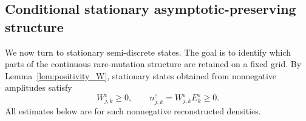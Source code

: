 \documentclass[11pt]{article}
\numberwithin{equation}{section}
\newtheorem{remark}{Remark}[section]
\begin{document}



\subsection{Conditional stationary asymptotic-preserving structure}
\label{subsec:stationary_discrete_asymptotic preserving}

We now turn to stationary semi-discrete states. The goal is to identify which
parts of the continuous rare-mutation structure are retained on a fixed grid.
By Lemma~\ref{lem:positivity_W}, stationary states obtained from nonnegative
amplitudes satisfy
\[
    W_{j,k}^\varepsilon\ge0,
    \qquad
    n_{j,k}^\varepsilon
    =W_{j,k}^\varepsilon E_k^\varepsilon\ge0 .
\]
All estimates below are for such nonnegative reconstructed densities.
\end{document}
